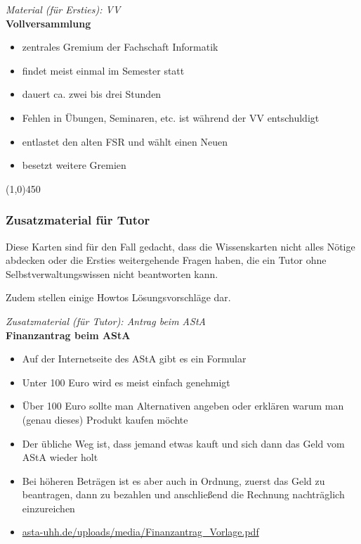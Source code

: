\documentclass[a4paper,11pt]{scrartcl} %
\begin{document}
\begin{framed}
\textit{Material (für Ersties): VV} \\

\textbf{Vollversammlung} \\
\begin{itemize}
\item zentrales Gremium der Fachschaft Informatik
\item findet meist einmal im Semester statt
\item dauert ca. zwei bis drei Stunden
\item Fehlen in Übungen, Seminaren, etc. ist während der VV entschuldigt
\item entlastet den alten FSR und wählt einen Neuen
\item besetzt weitere Gremien
\end{itemize}
\end{framed}


\begin{center}
\line(1,0){450}
\end{center}

\subsubsection{Zusatzmaterial für Tutor}

Diese Karten sind für den Fall gedacht, dass die Wissenskarten nicht
alles Nötige abdecken oder die Ersties weitergehende Fragen haben,
die ein Tutor ohne Selbstverwaltungswissen nicht beantworten kann.

Zudem stellen einige Howtos Lösungsvorschläge dar.
\begin{framed}
\textit{Zusatzmaterial (für Tutor): Antrag beim AStA}\\

\textbf{Finanzantrag beim AStA}\\
\begin{itemize}
\item Auf der Internetseite des AStA gibt es ein Formular
\item Unter 100 Euro wird es meist einfach genehmigt
\item Über 100 Euro sollte man Alternativen angeben oder erklären warum man (genau dieses) Produkt kaufen möchte
\item Der übliche Weg ist, dass jemand etwas kauft und sich dann das Geld vom AStA wieder holt
\item Bei höheren Beträgen ist es aber auch in Ordnung, zuerst das Geld zu beantragen,
dann zu bezahlen und anschließend die Rechnung nachträglich einzureichen
\item \url{asta-uhh.de/uploads/media/Finanzantrag_Vorlage.pdf}
\end{itemize}
\end{framed}
\end{document}

